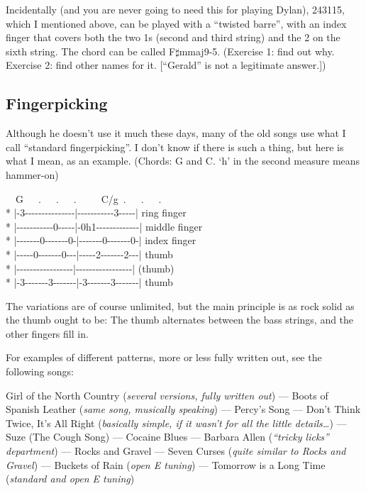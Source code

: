 \begin{articlelayout}
Incidentally (and you are never going to need this for playing Dylan),
243115, which I mentioned above, can be played with a ``{}twisted barre''{}, with an index
finger that covers both the two 1s (second and third string) and the 2
on the sixth string. The chord can be called
F$\sharp$mmaj9-5. (Exercise 1: find out why. Exercise 2: find other
names for it. [``{}Gerald''{} is not a legitimate answer.])


\subsection*{Fingerpicking}

Although he doesn't use it much these days, many of the old songs use
what I call ``{}standard fingerpicking''{}. I don't know if there is
such a thing, but here is what I mean, as an example. (Chords: G and
C. `{}h'{} in the second measure means hammer-on)

\begin{pre}
\begin{adjustwidth}{2em}{0em}
~~G~~~.~~~.~~~.~~~~~C/g~.~~~.~~~.\\*
|{-}3{-}{-}{-}{-}{-}{-}{-}{-}{-}{-}{-}{-}{-}{-}{-}|{-}{-}{-}{-}{-}{-}{-}{-}{-}{-}{-}3{-}{-}{-}{-}{-}| ring finger\\*
|{-}{-}{-}{-}{-}{-}{-}{-}{-}{-}{-}0{-}{-}{-}{-}{-}|{-}0h1{-}{-}{-}{-}{-}{-}{-}{-}{-}{-}{-}{-}{-}| middle finger\\*
|{-}{-}{-}{-}{-}{-}{-}0{-}{-}{-}{-}{-}{-}{-}0{-}|{-}{-}{-}{-}{-}{-}{-}0{-}{-}{-}{-}{-}{-}{-}0{-}| index finger\\*
|{-}{-}{-}{-}{-}0{-}{-}{-}{-}{-}{-}{-}0{-}{-}{-}|{-}{-}{-}{-}{-}2{-}{-}{-}{-}{-}{-}{-}2{-}{-}{-}| thumb\\*
|{-}{-}{-}{-}{-}{-}{-}{-}{-}{-}{-}{-}{-}{-}{-}{-}{-}|{-}{-}{-}{-}{-}{-}{-}{-}{-}{-}{-}{-}{-}{-}{-}{-}{-}| (thumb)\\*
|{-}3{-}{-}{-}{-}{-}{-}{-}3{-}{-}{-}{-}{-}{-}{-}|{-}3{-}{-}{-}{-}{-}{-}{-}3{-}{-}{-}{-}{-}{-}{-}| thumb
\end{adjustwidth}
\end{pre}

The variations are of course unlimited, but the main principle is as
rock solid as the thumb ought to be: The thumb alternates between the
bass strings, and the other fingers fill in.

For examples of different patterns, more or less fully written out,
see the following songs:

Girl of the North Country (\textit{several versions, fully written
out}) --- Boots of Spanish Leather (\textit{same song, musically
speaking}) --- Percy's Song --- Don't Think Twice, It's All Right
(\textit{basically simple, if it wasn't for all the little
details\ldots}) --- Suze (The Cough Song) --- Cocaine Blues ---
Barbara Allen (\textit{``tricky licks'' department}) --- Rocks and
Gravel --- Seven Curses (\textit{quite similar to \textnormal{Rocks and
Gravel}}) --- Buckets of Rain (\textit{open E tuning}) --- Tomorrow is
a Long Time (\textit{standard and open E tuning})


\end{articlelayout}
